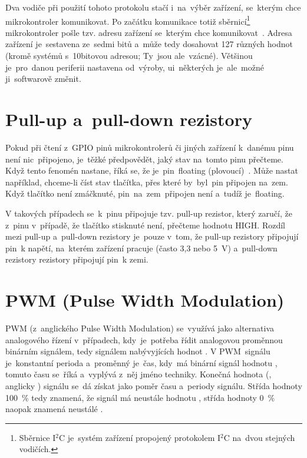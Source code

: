 Dva vodiče při použití tohoto protokolu stačí i~na~výběr zařízení, se~kterým chce mikrokontroler komunikovat.
Po začátku komunikace totiž sběrnicí\footnote{Sběrnice I$^{2}$C je~systém zařízení propojený protokolem I$^{2}$C na~dvou stejných vodičích.} mikrokontroler pošle tzv. adresu zařízení se~kterým chce komunikovat~\cite{sparkfun-i2c}.
Adresa zařízení je~sestavena ze~sedmi bitů a~může tedy dosahovat 127 různých hodnot (kromě systémů s~10bitovou adresou; Ty~jsou ale~vzácné).
Většinou je~pro~danou periferii nastavena od~výroby, ui~některých je~ale~možné ji~softwarově změnit.

\section{Pull-up a~pull-down rezistory}
Pokud při čtení z~GPIO pinů mikrokontrolerů či jiných zařízení k~danému pinu není nic~připojeno, je~těžké předpovědět, jaký stav na~tomto pinu přečteme.
Když tento fenomén nastane, říká se, že je~pin~floating (plovoucí)~\cite{sparkfun-pud}.
Může nastat například, chceme-li číst stav tlačítka, přes které by~byl~pin připojen na~zem. Když tlačítko není zmáčknuté, pin~na~zem~připojen není a~tudíž je~floating.

V takových případech se~k~pinu připojuje tzv. pull-up rezistor, který zaručí, že z~pinu v~případě, že tlačítko stisknuté není, přečteme hodnotu HIGH.
Rozdíl mezi pull-up a~pull-down rezistory je~pouze v~tom, že pull-up rezistory připojují pin~k napětí, na~kterém zařízení pracuje (často 3,3 nebo 5~V) a~pull-down rezistory rezistory připojují pin~k zemi.~\cite{sparkfun-pud}

\section{PWM (Pulse Width Modulation)}\label{sec:pwm}
PWM (z~anglického Pulse Width Modulation) se~využívá jako alternativa analogového řízení v~případech, kdy~je~potřeba řídit analogovou proměnnou binárním signálem, tedy signálem nabývyjících hodnot .
V PWM~signálu je~konstantní perioda a~proměnný je~čas, kdy~má binární signál hodnotu , tomuto času se~říká  a~vyplývá z~něj jméno techniky. Konečná hodnota (, anglicky ) signálu se~dá získat jako poměr času  a~periody signálu.
Střída hodnoty 100~\% tedy znamená, že signál má neustále hodnotu , střída hodnoty 0~\% naopak znamená neustálé .~\cite{pwm}\cite{wiki_pwm}

